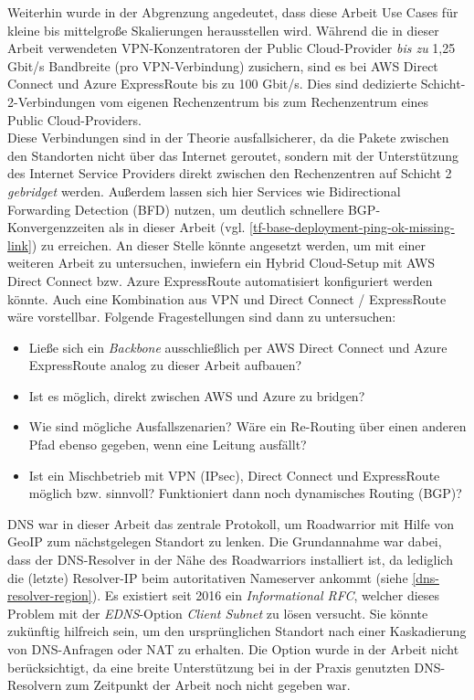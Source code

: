 Weiterhin wurde in der Abgrenzung angedeutet, dass diese Arbeit Use Cases für kleine bis mittelgroße Skalierungen herausstellen wird. Während die in dieser Arbeit verwendeten \gls{VPN-Konzentrator}en der Public Cloud-Provider \textit{bis zu} 1,25 Gbit/s Bandbreite (pro \gls{VPN}-Verbindung) zusichern, sind es bei AWS Direct Connect \cite{awsdc2020} und Azure ExpressRoute \cite{Washam2014} bis zu 100 Gbit/s. Dies sind dedizierte Schicht-2-Verbindungen vom eigenen Rechenzentrum bis zum Rechenzentrum eines Public Cloud-Providers.\\
Diese Verbindungen sind in der Theorie ausfallsicherer, da die Pakete zwischen den Standorten nicht über das Internet geroutet, sondern mit der Unterstützung des Internet Service Providers direkt zwischen den Rechenzentren auf Schicht 2 \textit{gebridget} werden. Außerdem lassen sich hier Services wie Bidirectional Forwarding Detection (BFD) nutzen, um deutlich schnellere \gls{BGP}-Konvergenzzeiten als in dieser Arbeit (vgl. \ref{tf-base-deployment-ping-ok-missing-link}) zu erreichen\cite{azurebfd2018}.
An dieser Stelle könnte angesetzt werden, um mit einer weiteren Arbeit zu untersuchen, inwiefern ein Hybrid Cloud-Setup mit AWS Direct Connect bzw. Azure ExpressRoute automatisiert konfiguriert werden könnte. Auch eine Kombination aus \gls{VPN} und Direct Connect / ExpressRoute wäre vorstellbar. Folgende Fragestellungen sind dann zu untersuchen:
\begin{itemize}
    \item Ließe sich ein \textit{Backbone} ausschließlich per AWS Direct Connect und Azure ExpressRoute analog zu dieser Arbeit aufbauen?
    \item Ist es möglich, direkt zwischen AWS und Azure zu bridgen?
    \item Wie sind mögliche Ausfallszenarien? Wäre ein Re-Routing über einen anderen Pfad ebenso gegeben, wenn eine Leitung ausfällt?
    \item Ist ein Mischbetrieb mit \gls{VPN} (\gls{IPsec}), Direct Connect und ExpressRoute möglich bzw. sinnvoll? Funktioniert dann noch dynamisches Routing (BGP)?
\end{itemize}
DNS war in dieser Arbeit das zentrale Protokoll, um \gls{Roadwarrior} mit Hilfe von \gls{GeoIP} zum nächstgelegen Standort zu lenken. Die Grundannahme war dabei, dass der \gls{DNS}-Resolver in der Nähe des \gls{Roadwarrior}s installiert ist, da lediglich die (letzte) Resolver-IP beim autoritativen Nameserver ankommt (siehe \ref{dns-resolver-region}). Es existiert seit 2016 ein \textit{Informational \gls{RFC}}, welcher dieses Problem mit der \textit{EDNS}-Option \textit{\gls{Client} Subnet} zu lösen versucht\cite{rfc7871}. Sie könnte zukünftig hilfreich sein, um den ursprünglichen Standort nach einer Kaskadierung von \gls{DNS}-Anfragen oder \gls{NAT} zu erhalten. Die Option wurde in der Arbeit nicht berücksichtigt, da eine breite Unterstützung bei in der Praxis genutzten \gls{DNS}-Resolvern zum Zeitpunkt der Arbeit noch nicht gegeben war.\\ 

